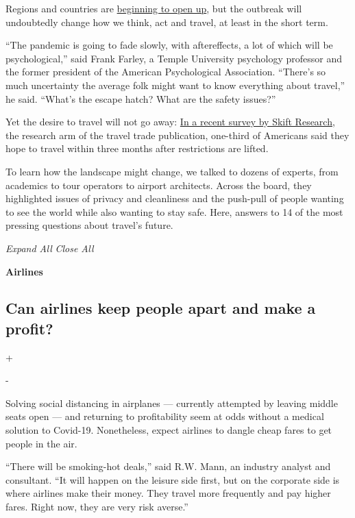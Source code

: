 Regions and countries are
\href{https://www.nytimes3xbfgragh.onion/2020/05/04/world/coronavirus-news.html\#link-383b3a65}{beginning
to open up}, but the outbreak will undoubtedly change how we think, act
and travel, at least in the short term.

``The pandemic is going to fade slowly, with aftereffects, a lot of
which will be psychological,'' said Frank Farley, a Temple University
psychology professor and the former president of the American
Psychological Association. ``There's so much uncertainty the average
folk might want to know everything about travel,'' he said. ``What's the
escape hatch? What are the safety issues?''

Yet the desire to travel will not go away:
\href{https://skift.com/2020/04/21/a-third-of-americans-want-to-travel-again-shortly-after-pandemic-is-contained-skift-researchs-latest-travel-tracker/}{In
a recent survey by Skift Research}, the research arm of the travel trade
publication, one-third of Americans said they hope to travel within
three months after restrictions are lifted.

To learn how the landscape might change, we talked to dozens of experts,
from academics to tour operators to airport architects. Across the
board, they highlighted issues of privacy and cleanliness and the
push-pull of people wanting to see the world while also wanting to stay
safe. Here, answers to 14 of the most pressing questions about travel's
future.

\emph{Expand All} \emph{Close All}

\textbf{Airlines}

\hypertarget{can-airlines-keep-people-apart-and-make-a-profit}{%
\subsection{Can airlines keep people apart and make a
profit?}\label{can-airlines-keep-people-apart-and-make-a-profit}}

+

-

Solving social distancing in airplanes --- currently attempted by
leaving middle seats open --- and returning to profitability seem at
odds without a medical solution to Covid-19. Nonetheless, expect
airlines to dangle cheap fares to get people in the air.

``There will be smoking-hot deals,'' said R.W. Mann, an industry analyst
and consultant. ``It will happen on the leisure side first, but on the
corporate side is where airlines make their money. They travel more
frequently and pay higher fares. Right now, they are very risk averse.''

